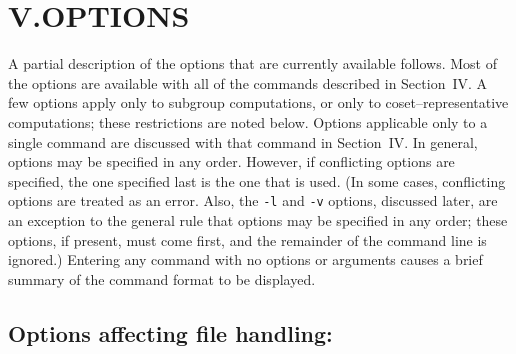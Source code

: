 \section{V.\quad OPTIONS}
%
A partial description of the options that are currently available
follows.  Most of the options are available with all of
the commands described in Section~IV.  A few options apply only to
subgroup computations, or only to coset--representative computations;
these restrictions are noted below.  Options applicable only to a single command
are discussed with that command in Section~IV.
\medbreak
In general, options may be specified in any order.  However, if
conflicting options are specified, the one specified last is
the one that is used.  (In some cases, conflicting options are treated
as an error.  Also, the {\tt -l} and {\tt -v} options, discussed later,
are an exception to the general rule that options may be specified in
any order; these options, if present, must come first, and the remainder
of the command line is ignored.)
\medbreak
Entering any command with no options or arguments causes a brief
summary of the command format to be displayed.
\bigbreak
\subsection{Options affecting file handling:}
\nobreak\medskip\nobreak
%
\medbreak
{}
%
\bigbreak
